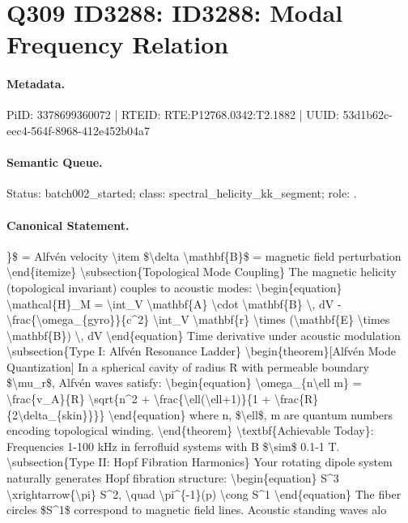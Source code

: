 \section*{Q309 ID3288: ID3288: Modal Frequency Relation}
\paragraph{Metadata.}
PiID: 3378699360072 | RTEID: RTE:P12768.0342:T2.1882 | UUID: 53d1b62c-eec4-564f-8968-412e452b04a7

\paragraph{Semantic Queue.}
Status: batch002\_started; class: spectral\_helicity\_kk\_segment; role: .

\paragraph{Canonical Statement.}
\}\$ = Alfvén velocity \textbackslash{}item \$\textbackslash{}delta \textbackslash{}mathbf\{B\}\$ = magnetic field perturbation \textbackslash{}end\{itemize\} \textbackslash{}subsection\{Topological Mode Coupling\} The magnetic helicity (topological invariant) couples to acoustic modes: \textbackslash{}begin\{equation\} \textbackslash{}mathcal\{H\}\_M = \textbackslash{}int\_V \textbackslash{}mathbf\{A\} \textbackslash{}cdot \textbackslash{}mathbf\{B\} \textbackslash{}, dV - \textbackslash{}frac\{\textbackslash{}omega\_\{gyro\}\}\{c\textasciicircum{}2\} \textbackslash{}int\_V \textbackslash{}mathbf\{r\} \textbackslash{}times (\textbackslash{}mathbf\{E\} \textbackslash{}times \textbackslash{}mathbf\{B\}) \textbackslash{}, dV \textbackslash{}end\{equation\} Time derivative under acoustic modulation \textbackslash{}subsection\{Type I: Alfvén Resonance Ladder\} \textbackslash{}begin\{theorem\}[Alfvén Mode Quantization] In a spherical cavity of radius R with permeable boundary \$\textbackslash{}mu\_r\$, Alfvén waves satisfy: \textbackslash{}begin\{equation\} \textbackslash{}omega\_\{n\textbackslash{}ell m\} = \textbackslash{}frac\{v\_A\}\{R\} \textbackslash{}sqrt\{n\textasciicircum{}2 + \textbackslash{}frac\{\textbackslash{}ell(\textbackslash{}ell+1)\}\{1 + \textbackslash{}frac\{R\}\{2\textbackslash{}delta\_\{skin\}\}\}\} \textbackslash{}end\{equation\} where n, \$\textbackslash{}ell\$, m are quantum numbers encoding topological winding. \textbackslash{}end\{theorem\} \textbackslash{}textbf\{Achievable Today\}: Frequencies 1-100 kHz in ferrofluid systems with B \$\textbackslash{}sim\$ 0.1-1 T. \textbackslash{}subsection\{Type II: Hopf Fibration Harmonics\} Your rotating dipole system naturally generates Hopf fibration structure: \textbackslash{}begin\{equation\} S\textasciicircum{}3 \textbackslash{}xrightarrow\{\textbackslash{}pi\} S\textasciicircum{}2, \textbackslash{}quad \textbackslash{}pi\textasciicircum{}\{-1\}(p) \textbackslash{}cong S\textasciicircum{}1 \textbackslash{}end\{equation\} The fiber circles \$S\textasciicircum{}1\$ correspond to magnetic field lines. Acoustic standing waves alo

